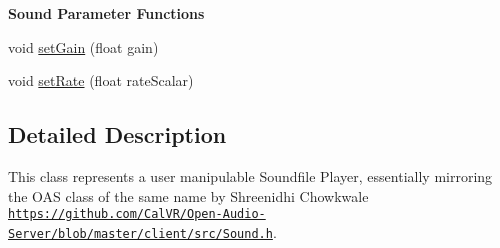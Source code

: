 \begin{Indent}{\bf Sound Parameter Functions}\par
\begin{DoxyCompactItemize}
\item 
void \hyperlink{classColliderPlusPlus_1_1Sound_ab64f46659f59a6d7b7bc206cca6402cf}{set\-Gain} (float gain)
\item 
void \hyperlink{classColliderPlusPlus_1_1Sound_a5bd234602a61929747697677d972fc30}{set\-Rate} (float rate\-Scalar)
\end{DoxyCompactItemize}
\end{Indent}


\subsection{Detailed Description}
This class represents a user manipulable Soundfile Player, essentially mirroring the O\-A\-S class of the same name by Shreenidhi Chowkwale  \href{https://github.com/CalVR/Open-Audio-Server/blob/master/client/src/Sound.h}{\tt https\-://github.\-com/\-Cal\-V\-R/\-Open-\/\-Audio-\/\-Server/blob/master/client/src/\-Sound.\-h}. 

